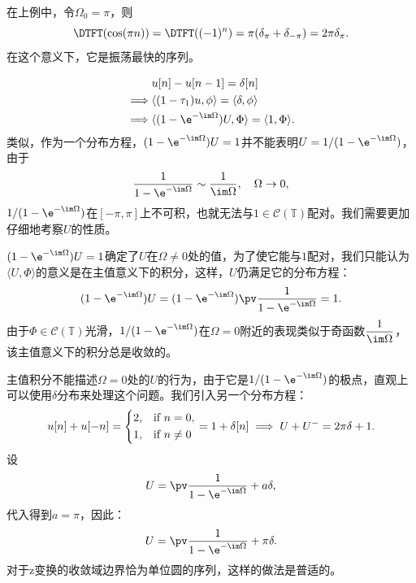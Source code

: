 在上例中，令$\Omega_0=\pi$，则
\begin{equation}
    \DTFT(\cos(\pi n))=\DTFT((-1)^n)=\pi(\delta_\pi+\delta_{-\pi})=2\pi\delta_\pi.
\end{equation}
在这个意义下，它是振荡最快的序列。

\begin{example}[单位阶跃序列的离散时间傅里叶变换]
    \begin{align}
        & u[n]-u[n-1]=\delta[n] \nonumber \\
        \implies & \langle (1-\tau_1)u,\phi\rangle=\langle\delta,\phi\rangle \nonumber \\
        \implies & \langle(1-\e^{-\im\Omega})U,\Phi\rangle=\langle 1,\Phi\rangle.
    \end{align}
    类似，作为一个分布方程，$(1-\e^{-\im\Omega})U=1$并不能表明$U=1/(1-\e^{-\im\Omega})$，由于
    \begin{equation}
        \frac{1}{1-\e^{-\im\Omega}}\sim\frac{1}{\im\Omega},\quad \Omega\to 0,
    \end{equation}
    $1/(1-\e^{-\im\Omega})$在$[-\pi,\pi]$上不可积，也就无法与$1\in\mathcal{C}(\mathbb{T})$配对。我们需要更加仔细地考察$U$的性质。

    $(1-\e^{-\im\Omega})U=1$确定了$U$在$\Omega\neq 0$处的值，为了使它能与$1$配对，我们只能认为$\langle U,\Phi\rangle$的意义是在主值意义下的积分，这样，$U$仍满足它的分布方程：
    \begin{equation}
        (1-\e^{-\im\Omega})U=(1-\e^{-\im\Omega})\pv\frac{1}{1-\e^{-\im\Omega}}=1.
    \end{equation}
    由于$\Phi\in\mathcal{C}(\mathbb{T})$光滑，$1/(1-\e^{-\im\Omega})$在$\Omega=0$附近的表现类似于奇函数$\displaystyle\frac{1}{\im\Omega}$，该主值意义下的积分总是收敛的。

    主值积分不能描述$\Omega=0$处的$U$的行为，由于它是$1/(1-\e^{-\im\Omega})$的极点，直观上可以使用$\delta$分布来处理这个问题。我们引入另一个分布方程：
    \begin{equation}\label{eq:distribution_equation}
        u[n]+u[-n]=\begin{dcases}
            2, & \text{if } n=0,    \\
            1, & \text{if } n\neq 0
        \end{dcases}=1+\delta[n]\implies U+U^-=2\pi\delta+1.
    \end{equation}
    设
    \begin{equation}
        U=\pv\frac{1}{1-\e^{-\im\Omega}}+a\delta,
    \end{equation}
    代入得到$a=\pi$，因此：
    \begin{equation}
        U=\pv\frac{1}{1-\e^{-\im\Omega}}+\pi\delta.
    \end{equation}
    对于z变换的收敛域边界恰为单位圆的序列，这样的做法是普适的。
\end{example}
